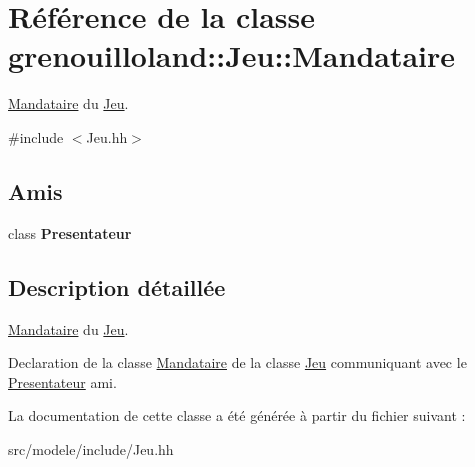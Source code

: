 \hypertarget{classgrenouilloland_1_1Jeu_1_1Mandataire}{\section{Référence de la classe grenouilloland\-:\-:Jeu\-:\-:Mandataire}
\label{classgrenouilloland_1_1Jeu_1_1Mandataire}
}


\hyperlink{classgrenouilloland_1_1Jeu_1_1Mandataire}{Mandataire} du \hyperlink{classgrenouilloland_1_1Jeu}{Jeu}.  




{\ttfamily \#include $<$Jeu.\-hh$>$}

\subsection*{Amis}
\begin{DoxyCompactItemize}
\item 
\hypertarget{classgrenouilloland_1_1Jeu_1_1Mandataire_afe4b621cff2b09f0856344dc3675efd4}{class {\bfseries Presentateur}}\label{classgrenouilloland_1_1Jeu_1_1Mandataire_afe4b621cff2b09f0856344dc3675efd4}

\end{DoxyCompactItemize}


\subsection{Description détaillée}
\hyperlink{classgrenouilloland_1_1Jeu_1_1Mandataire}{Mandataire} du \hyperlink{classgrenouilloland_1_1Jeu}{Jeu}. 

Declaration de la classe \hyperlink{classgrenouilloland_1_1Jeu_1_1Mandataire}{Mandataire} de la classe \hyperlink{classgrenouilloland_1_1Jeu}{Jeu} communiquant avec le \hyperlink{classgrenouilloland_1_1Presentateur}{Presentateur} ami. 

La documentation de cette classe a été générée à partir du fichier suivant \-:\begin{DoxyCompactItemize}
\item 
src/modele/include/Jeu.\-hh\end{DoxyCompactItemize}
